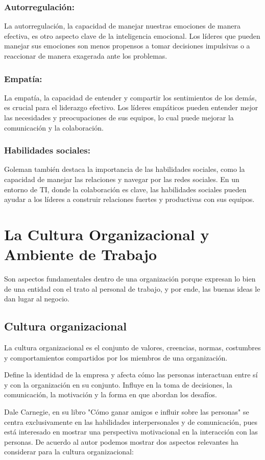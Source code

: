 \documentclass[journal]{IEEEtran}
\begin{document}
\subsubsection{Autorregulación:} La autorregulación, la capacidad de manejar nuestras emociones de manera efectiva, es otro aspecto clave de la inteligencia emocional. Los líderes que pueden manejar sus emociones son menos propensos a tomar decisiones impulsivas o a reaccionar de manera exagerada ante los problemas.
\subsubsection{Empatía:} La empatía, la capacidad de entender y compartir los sentimientos de los demás, es crucial para el liderazgo efectivo. Los líderes empáticos pueden entender mejor las necesidades y preocupaciones de sus equipos, lo cual puede mejorar la comunicación y la colaboración.
\subsubsection{Habilidades sociales:} Goleman también destaca la importancia de las habilidades sociales, como la capacidad de manejar las relaciones y navegar por las redes sociales. En un entorno de TI, donde la colaboración es clave, las habilidades sociales pueden ayudar a los líderes a construir relaciones fuertes y productivas con sus equipos.

\section{La Cultura Organizacional y Ambiente de Trabajo}
Son aspectos fundamentales dentro de una organización porque expresan lo bien de una entidad con el trato al personal de trabajo, y por ende, las buenas ideas le dan lugar al negocio.

\subsection{Cultura organizacional}
La cultura organizacional es el conjunto de valores, creencias, normas, costumbres y comportamientos compartidos por los miembros de una organización.

Define la identidad de la empresa y afecta cómo las personas interactuan entre sí y con la organización en su conjunto. Influye en la toma de decisiones, la comunicación, la motivación y la forma en que abordan los desafíos.

Dale Carnegie, en su libro "Cómo ganar amigos e influir sobre las personas" se centra exclusivamente en las habilidades interpersonales y de comunicación, pues está interesado en mostrar una perspectiva motivacional en la interacción con las personas. De acuerdo al autor podemos mostrar dos aspectos relevantes ha considerar para la cultura organizacional:
\end{document}
